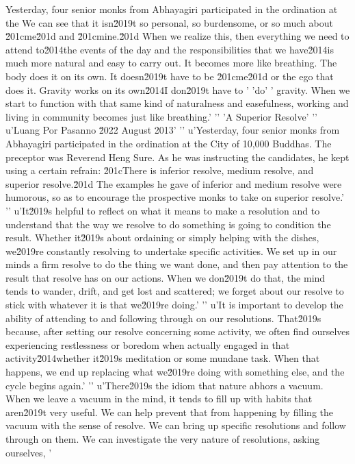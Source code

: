 Yesterday, four senior monks from Abhayagiri participated in the 
ordination at the We can see that it isn\u2019t so personal, so burdensome, or so much about \u201cme\u201d and \u201cmine.\u201d When we realize this, then everything we need to attend to\u2014the events of the day and the responsibilities that we have\u2014is much more natural and easy to carry out. It becomes more like breathing. The body does it on its own. It doesn\u2019t have to be \u201cme\u201d or the ego that does it. Gravity works on its own\u2014I don\u2019t have to '
'do'
' gravity. When we start to function with that same kind of naturalness and easefulness, working and living in community becomes just like breathing.'
'\n'
'A Superior Resolve'
'\n'
u'Luang Por Pasanno \u2022 August 2013'
'\n'
u'Yesterday, four senior monks from Abhayagiri participated in the ordination at the City of 10,000 Buddhas. The preceptor was Reverend Heng Sure. As he was instructing the candidates, he kept using a certain refrain: \u201cThere is inferior resolve, medium resolve, and superior resolve.\u201d The examples he gave of inferior and medium resolve were humorous, so as to encourage the prospective monks to take on superior resolve.'
'\n'
u'It\u2019s helpful to reflect on what it means to make a resolution and to understand that the way we resolve to do something is going to condition the result. Whether it\u2019s about ordaining or simply helping with the dishes, we\u2019re constantly resolving to undertake specific activities. We set up in our minds a firm resolve to do the thing we want done, and then pay attention to the result that resolve has on our actions. When we don\u2019t do that, the mind tends to wander, drift, and get lost and scattered; we forget about our resolve to stick with whatever it is that we\u2019re doing.'
'\n'
u'It is important to develop the ability of attending to and following through on our resolutions. That\u2019s because, after setting our resolve concerning some activity, we often find ourselves experiencing restlessness or boredom when actually engaged in that activity\u2014whether it\u2019s meditation or some mundane task. When that happens, we end up replacing what we\u2019re doing with something else, and the cycle begins again.'
'\n'
u'There\u2019s the idiom that nature abhors a vacuum. When we leave a vacuum in the mind, it tends to fill up with habits that aren\u2019t very useful. We can help prevent that from happening by filling the vacuum with the sense of resolve. We can bring up specific resolutions and follow through on them. We can investigate the very nature of resolutions, asking ourselves, '
